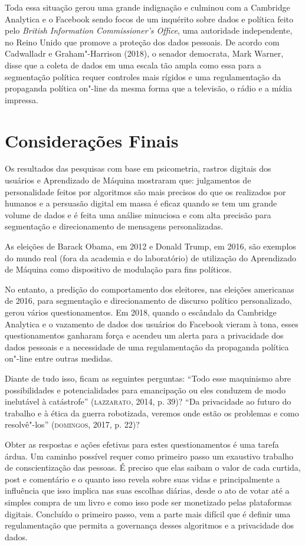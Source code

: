 Toda essa situação gerou uma grande indignação e culminou com a
Cambridge Analytica e o Facebook sendo focos de um inquérito sobre dados
e política feito pelo \emph{British Information Commissioner's Office},
uma autoridade independente, no Reino Unido que promove a proteção dos
dados pessoais. De acordo com Cadwalladr e Graham"-Harrison
(2018), o senador democrata, Mark Warner, disse que a coleta de dados em
uma escala tão ampla como essa para a segmentação política requer
controles mais rígidos e uma regulamentação da propaganda política
on"-line da mesma forma que a televisão, o rádio e a mídia impressa.

\section{Considerações Finais}

\noindent{}Os resultados das pesquisas com base em psicometria, rastros digitais
dos usuários e Aprendizado de Máquina mostraram que: julgamentos de
personalidade feitos por algoritmos são mais precisos do que os
realizados por humanos e a persuasão digital em massa é eficaz quando se
tem um grande volume de dados e é feita uma análise minuciosa e com alta
precisão para segmentação e direcionamento de mensagens personalizadas.

As eleições de Barack Obama, em 2012 e Donald Trump, em 2016, são
exemplos do mundo real (fora da academia e do laboratório) de utilização
do Aprendizado de Máquina como dispositivo de modulação para fins
políticos.

No entanto, a predição do comportamento dos eleitores, nas eleições
americanas de 2016, para segmentação e direcionamento de discurso
político personalizado, gerou vários questionamentos. Em 2018, quando o
escândalo da Cambridge Analytica e o vazamento de dados dos usuários do
Facebook vieram à tona, esses questionamentos ganharam força e acendeu
um alerta para a privacidade dos dados pessoais e a necessidade de uma
regulamentação da propaganda política on"-line entre outras medidas.

Diante de tudo isso, ficam as seguintes perguntas: ``Todo esse
maquinismo abre possibilidades e potencialidades para emancipação ou
eles conduzem de modo inelutável à catástrofe'' (\textsc{lazzarato}, 2014, p. 39)?
``Da privacidade ao futuro do trabalho e à ética da guerra robotizada,
veremos onde estão os problemas e como resolvê"-los'' (\textsc{domingos}, 2017, p. 22)?

Obter as respostas e ações efetivas para estes questionamentos é uma
tarefa árdua. Um caminho possível requer como primeiro passo um
exaustivo trabalho de conscientização das pessoas. É preciso que elas
saibam o valor de cada curtida, post e comentário e o quanto isso revela
sobre suas vidas e principalmente a influência que isso implica nas suas
escolhas diárias, desde o ato de votar até a simples compra de um livro
e como isso pode ser monetizado pelas plataformas digitais. Concluído o
primeiro passo, vem a parte mais difícil que é definir uma
regulamentação que permita a governança desses algoritmos e a
privacidade dos dados.

